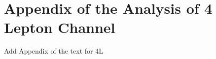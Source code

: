 \section{Appendix of the Analysis of 4 Lepton Channel }
\label{sec:AppAnaFourL}
Add Appendix of the text for 4L


